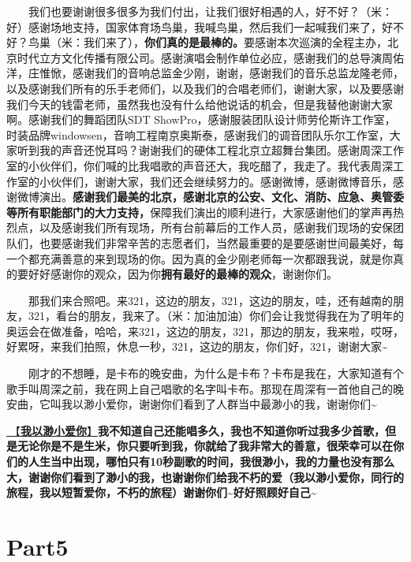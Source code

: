 \documentclass[]{ctexbook}
\begin{document}
  我们也要谢谢很多很多为我们付出，让我们很好相遇的人，好不好？（米：好）感谢场地支持，国家体育场鸟巢，我喊鸟巢，然后我们一起喊我们来了，好不好？鸟巢（米：我们来了），\textbf{你们真的是最棒的。}要感谢本次巡演的全程主办，北京时代立方文化传播有限公司。感谢演唱会制作单位必应，感谢我们的总导演周佑洋，庄惟惞，感谢我们的音响总监金少刚，谢谢，感谢我们的音乐总监龙隆老师，以及感谢我们所有的乐手老师们，以及我们的合唱老师们，谢谢大家，以及要感谢我们今天的钱雷老师，虽然我也没有什么给他说话的机会，但是我替他谢谢大家啊。感谢我们的舞蹈团队SDT ShowPro，感谢服装团队设计师劳伦斯许工作室，时装品牌windowsen，音响工程南京奥斯泰，感谢我们的调音团队乐尔工作室，大家听到我的声音还悦耳吗？谢谢我们的硬体工程北京立超舞台集团。感谢周深工作室的小伙伴们，你们喊的比我唱歌的声音还大，我吃醋了，我走了。我代表周深工作室的小伙伴们，谢谢大家，我们还会继续努力的。感谢微博，感谢微博音乐，感谢微博演出。\textbf{感谢我们最美的北京，感谢北京的公安、文化、消防、应急、奥管委等所有职能部门的大力支持，}保障我们演出的顺利进行，大家感谢他们的掌声再热烈点，以及感谢我们所有现场，所有台前幕后的工作人员，感谢我们现场的安保团队们，也要感谢我们非常辛苦的志愿者们，当然最重要的是要感谢世间最美好，每一个都充满善意的来到现场的你。因为真的金少刚老师每一次都跟我说，就是你真的要好好感谢你的观众，因为你\textbf{拥有最好的最棒的观众}，谢谢你们。

  那我们来合照吧。来321，这边的朋友，321，这边的朋友，哇，还有越南的朋友，321，看台的朋友，我来了。（米：加油加油）你们会让我觉得我在为了明年的奥运会在做准备，哈哈，来321，这边的朋友，321，那边的朋友，我来啦，哎呀，好累呀，来我们拍照，休息一秒，321，这边的朋友，你们好，321，谢谢大家\textasciitilde{}

  刚才的不想睡，是卡布的晚安曲，为什么是卡布？卡布是我在，大家知道有个歌手叫周深之前，我在网上自己唱歌的名字叫卡布。那现在周深有一首他自己的晚安曲，它叫我以渺小爱你，谢谢你们看到了人群当中最渺小的我，谢谢你们\textasciitilde{}

\hyperref[loving-you-in-my-humble-way]{🎵【\textbf{我以渺小爱你}】}\textbf{我不知道自己还能唱多久，我也不知道你听过我多少首歌，但是无论你是不是生米，你只要听到我，你就给了我非常大的善意，很荣幸可以在你们的人生当中出现，哪怕只有10秒副歌的时间，我很渺小，我的力量也没有那么大，谢谢你们看到了渺小的我，也谢谢你们给我不朽的爱（我以渺小爱你，同行的旅程，我以短暂爱你，不朽的旅程）谢谢你们\textasciitilde 好好照顾好自己\textasciitilde{}}

\section{Part5}\label{beijing-20240922-part5}
\end{document}
